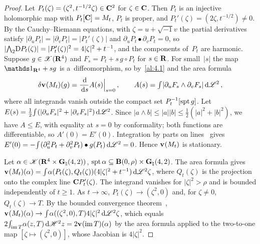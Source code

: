 \begin{proof}
    Let $P_t(\zeta) = (\zeta^2, t^{-1/2} \zeta) \in \mathbf{C}^2$ for $\zeta \in \mathbf{C}$. Then $P_t$ is an
    injective holomorphic map with $P_t[\mathbf{C}] = M_t$, $P_t$ is proper, and $P_t'(\zeta) = (2\zeta,
    t^{-1/2}) \ne 0$. By the Cauchy--Riemann equations, with $\zeta = u + \sqrt{-1} v$ the
    partial derivatives satisfy $|\partial_u P_t| = |\partial_v P_t| = |P_t'(\zeta)|$ and
    $\partial_u P_t \bullet \partial_v P_t = 0$, so $|{\textstyle\boldsymbol{\bigwedge}}_{{2}} \mathrm{D} P_t(\zeta)| = |P_t'(\zeta)|^2 =
    4|\zeta|^2 + t^{-1}$, and the components of~$P_t$ are harmonic. Suppose $g \in \mathscr{X}(\mathbf{R}^4)$ and
    $F_s = P_t + s\, g \circ P_t$ for $s \in \mathbf{R}$. For small~$|s|$ the map $\id{\R^4} + s g$ is
    a~diffeomorphism, so by~\ref{al:4.1} and the area formula~\cite[3.2.3, 3.2.5]{Federer1969}
    \begin{displaymath}
        \delta \mathbf{v}_{}(M_t)(g) = \frac{\,\mathrm{d}}{\,\mathrm{d} s} A(s) \Big|_{s=0} \,, \qquad A(s) = {\textstyle\int_{}^{}}
        |\partial_u F_s \wedge \partial_v F_s| \,\mathrm{d} \mathscr{L}^2 \,,
    \end{displaymath}
    where all integrands vanish outside the compact set $P_t^{-1}[\operatorname{spt} g]$. Let $E(s) =
    \frac{1}{2} {\textstyle\int_{}^{}} (|\partial_u F_s|^2 + |\partial_v F_s|^2) \,\mathrm{d} \mathscr{L}^2$. Since $|a \wedge
    b| \le |a| |b| \le \frac12 (|a|^2 + |b|^2)$, we have $A \le E$, with equality at $s = 0$ by
    conformality; both functions are differentiable, so $A'(0) = E'(0)$. Integration by parts on
    lines~\cite[2.6.2, 2.9.20]{Federer1969} gives $E'(0) = - {\textstyle\int_{}^{}} (\partial_u^2 P_t +
    \partial_v^2 P_t) \bullet g(P_t) \,\mathrm{d} \mathscr{L}^2 = 0$. Hence $\mathbf{v}_{}(M_t)$ is stationary.

    Let $\alpha \in \mathscr{K}(\mathbf{R}^4 \times \mathbf{G}_{\natural}(4,2))$, $\operatorname{spt} \alpha \subseteq \mathbf{B}(0,\rho)
    \times \mathbf{G}_{\natural}(4,2)$. The area formula gives $\mathbf{v}_{}(M_t)(\alpha) = {\textstyle\int_{}^{}}
    \alpha(P_t(\zeta), Q_t(\zeta)) (4 |\zeta|^2 + t^{-1}) \,\mathrm{d} \mathscr{L}^2 \zeta$, where $Q_t(\zeta)$ is
    the projection onto the complex line $\mathbf{C} P_t'(\zeta)$. The integrand vanishes for $|\zeta|^2 >
    \rho$ and is bounded independently of $t \ge 1$. As $t \to \infty$, $P_t(\zeta) \to
    (\zeta^2,0)$ and, for $\zeta \ne 0$, $Q_t(\zeta) \to T$. By the bounded convergence
    theorem~\cite[2.4.9]{Federer1969}, $\mathbf{v}_{}(M_t)(\alpha) \to {\textstyle\int_{}^{}} \alpha((\zeta^2,0),T)
    4 |\zeta|^2 \,\mathrm{d} \mathscr{L}^2 \zeta$, which equals $2 {\textstyle\int_{\operatorname{im} T}^{}} \alpha(z,T) \,\mathrm{d} \mathscr{H}^2 z =
    2 \mathbf{v}_{}(\operatorname{im} T)(\alpha)$ by the area formula applied to the two-to-one map $[\zeta \mapsto
    (\zeta^2,0)]$, whose Jacobian is $4 |\zeta|^2$.
\end{proof}

